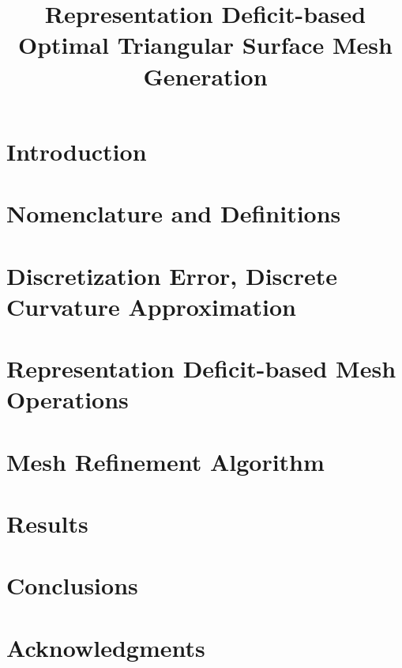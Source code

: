 \documentclass[11pt]{article}
\begin{document}
\title{Representation Deficit-based Optimal Triangular Surface Mesh 
Generation}
\maketitle

\begin{abstract}

\end{abstract}

\section{Introduction}


\section{Nomenclature and Definitions}


\section{Discretization Error, Discrete Curvature Approximation}


\section{Representation Deficit-based Mesh Operations}



\section{Mesh Refinement Algorithm}




\section{Results}


\section{Conclusions}


\section{Acknowledgments}




\end{document}

